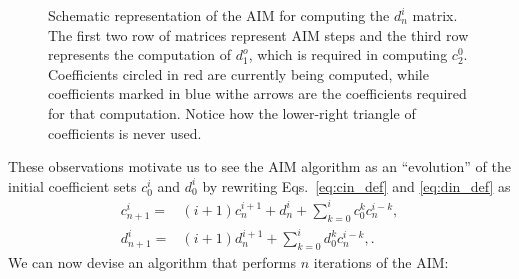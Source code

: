 \begin{figure}[!ht]
  \centering
  
  \caption{Schematic representation of the \ac{AIM} for computing the $d^i_n$ matrix. The first two row of matrices represent \ac{AIM} steps and the third row represents the computation of $d^o_1$, which is required in computing $c^0_2$. Coefficients circled in red are currently being computed, while coefficients marked in blue withe arrows are the coefficients required for that computation. Notice how the lower-right triangle of coefficients is never used.}
  \label{fig:aim_coeffs_d}
\end{figure}

These observations motivate us to see the \ac{AIM} algorithm as an ``evolution'' of the initial coefficient sets $c^i_0$ and $d^i_0$ by rewriting Eqs.~\eqref{eq:cin_def} and \eqref{eq:din_def} as
%
\begin{align}
  c^i_{n+1} = & (i+1)c^{i+1}_n + d^i_n + \sum_{k=0}^{i}c^k_0c^{i-k}_n, \label{eq:cin_iterative} \\
  d^i_{n+1} = & (i+1)d^{i+1}_n + \sum_{k=0}^{i}d^k_0c^{i-k}_n, \label{eq:din_iterative}
  .
\end{align}
%
We can now devise an algorithm that performs $n$ iterations of the \ac{AIM}:
%
